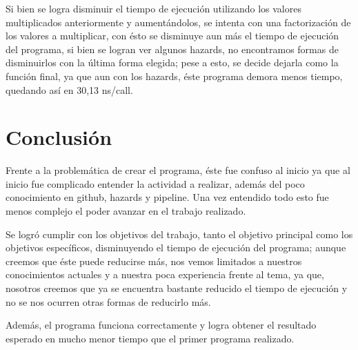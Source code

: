 \documentclass[12pt,letterpaper]{article}
\begin{document}
Si bien se logra disminuir el tiempo de ejecución utilizando los valores multiplicados anteriormente y aumentándolos, se intenta con una factorización de los valores a multiplicar, con ésto se disminuye aun más el tiempo de ejecución del programa, si bien se logran ver algunos hazards, no encontramos formas de disminuirlos con la última forma elegida; pese a esto, se decide dejarla como la función final, ya que aun con los hazards, éste programa demora menos tiempo, quedando así en 30,13 ns/call.

\newpage
\section{Conclusión}
Frente a la problemática de crear el programa, éste fue confuso al inicio ya que al inicio fue complicado entender la actividad a realizar, además del poco conocimiento en github, hazards y pipeline. Una vez entendido todo esto fue menos complejo el poder avanzar en el trabajo realizado.

Se logró cumplir con los objetivos del trabajo, tanto el objetivo principal como los objetivos específicos, disminuyendo el tiempo de ejecución del programa; aunque creemos que éste puede reducirse más, nos vemos limitados a nuestros conocimientos actuales y a nuestra poca experiencia frente al tema, ya que, nosotros creemos que ya se encuentra bastante reducido el tiempo de ejecución y no se nos ocurren otras formas de reducirlo más.

Además, el programa funciona correctamente y logra obtener el resultado esperado en mucho menor tiempo que el primer programa realizado.

\newpage
{}


\end{document}
